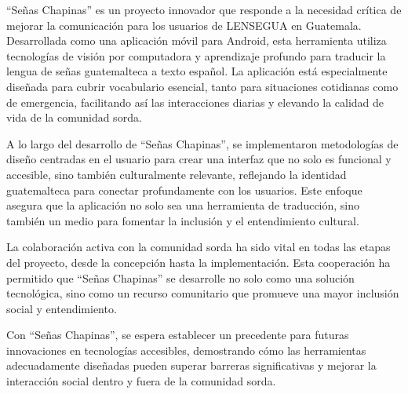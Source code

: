``Señas Chapinas'' es un proyecto innovador que responde a la necesidad crítica de mejorar la comunicación para los usuarios de LENSEGUA en Guatemala. Desarrollada como una aplicación móvil para Android, esta herramienta utiliza tecnologías de visión por computadora y aprendizaje profundo para traducir la lengua de señas guatemalteca a texto español. La aplicación está especialmente diseñada para cubrir vocabulario esencial, tanto para situaciones cotidianas como de emergencia, facilitando así las interacciones diarias y elevando la calidad de vida de la comunidad sorda.

A lo largo del desarrollo de ``Señas Chapinas'', se implementaron metodologías de diseño centradas en el usuario para crear una interfaz que no solo es funcional y accesible, sino también culturalmente relevante, reflejando la identidad guatemalteca para conectar profundamente con los usuarios. Este enfoque asegura que la aplicación no solo sea una herramienta de traducción, sino también un medio para fomentar la inclusión y el entendimiento cultural.

La colaboración activa con la comunidad sorda ha sido vital en todas las etapas del proyecto, desde la concepción hasta la implementación. Esta cooperación ha permitido que ``Señas Chapinas'' se desarrolle no solo como una solución tecnológica, sino como un recurso comunitario que promueve una mayor inclusión social y entendimiento.

Con ``Señas Chapinas'', se espera establecer un precedente para futuras innovaciones en tecnologías accesibles, demostrando cómo las herramientas adecuadamente diseñadas pueden superar barreras significativas y mejorar la interacción social dentro y fuera de la comunidad sorda.